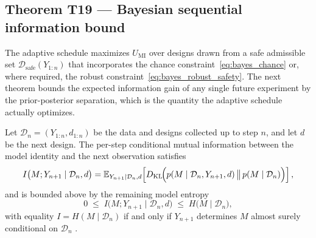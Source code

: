 \subsection{Theorem T19 --- Bayesian sequential information bound}
\label{subsec:bayes:T19}

The adaptive schedule maximizes $U_{\mathrm{MI}}$ over designs drawn from a safe admissible set $\mathcal{D}_{\mathrm{safe}}(Y_{1:n})$ that incorporates the chance constraint~\eqref{eq:bayes_chance} or, where required, the robust constraint~\eqref{eq:bayes_robust_safety}. The next theorem bounds the expected information gain of any single future experiment by the prior-posterior separation, which is the quantity the adaptive schedule actually optimizes.

\begin{theorem}
\label{thm:T19}
Let $\mathcal{D}_n = (Y_{1:n}, d_{1:n})$ be the data and designs collected up to step $n$, and let $d$ be the next design. The per-step conditional mutual information between the model identity and the next observation satisfies
\begin{equation}
I\bigl(M; Y_{n+1} \mid \mathcal{D}_n, d\bigr)
=
\mathbb{E}_{Y_{n+1} \mid \mathcal{D}_n, d}\!\left[
D_{\mathrm{KL}}\!\Bigl(
p(M \mid \mathcal{D}_n, Y_{n+1}, d)
\,\big\|\,
p(M \mid \mathcal{D}_n)
\Bigr)
\right],
\label{eq:bayes_seq}
\end{equation}
and is bounded above by the remaining model entropy
\begin{equation}
0 \;\le\; I\bigl(M; Y_{n+1} \mid \mathcal{D}_n, d\bigr)
\;\le\; H\bigl(M \mid \mathcal{D}_n\bigr),
\label{eq:bayes_seq_bound}
\end{equation}
with equality $I = H(M \mid \mathcal{D}_n)$ if and only if $Y_{n+1}$ determines $M$ almost surely conditional on $\mathcal{D}_n$ .
\end{theorem}


